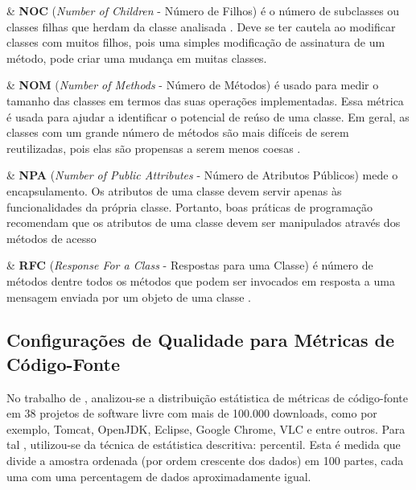 \begin{easylist}
	& \textbf{NOC} (\textit{Number of Children} - Número de Filhos)
	é o número de subclasses ou classes filhas que herdam da classe analisada 
	\cite{Rosenberg97}. Deve se ter cautela ao modificar classes com muitos 
	filhos, pois uma simples modificação de assinatura de um método, pode criar
	uma mudança em muitas classes.


	& \textbf{NOM} (\textit{Number of Methods} - Número de Métodos) é usado 
	para medir o tamanho das classes em termos das suas operações 
	implementadas. Essa métrica é usada para ajudar a identificar o 
	potencial de reúso de uma classe. Em geral, as classes com um grande 
	número de métodos são mais difíceis de serem reutilizadas, pois elas 
	são propensas a serem menos coesas \cite{Lorenz94}.
	

	& \textbf{NPA} (\textit{Number of Public Attributes} - Número de Atributos Públicos) mede o encapsulamento. Os atributos de uma classe devem servir apenas às funcionalidades da própria classe. Portanto, boas práticas de programação recomendam que os atributos de uma classe devem ser manipulados através dos métodos de acesso \cite{beck1997smalltalk}



	& \textbf{RFC} (\textit{Response For a Class} - Respostas para uma 
	Classe) é número de métodos dentre todos os métodos que podem ser invocados 
	em resposta a uma mensagem enviada por um objeto de uma classe 
	\cite{Sharble93}.





\end{easylist}
	
\subsection{Configurações de Qualidade para Métricas de Código-Fonte}
\label{sec:Intervalos das Métricas}

No trabalho de , analizou-se a distribuição estátistica de métricas de código-fonte em 38  projetos de software livre com mais de 100.000 downloads, como por exemplo, Tomcat, OpenJDK, Eclipse, Google Chrome, VLC e entre outros. Para tal , utilizou-se da técnica de estátistica descritiva: percentil. Esta é medida que divide a amostra ordenada (por ordem crescente dos dados) em 100 partes, cada uma com uma percentagem de dados aproximadamente igual. 

